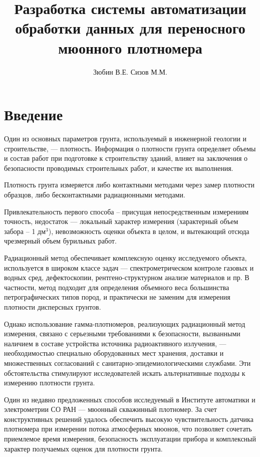 \documentclass[a4paper,10pt]{article}
\title{Разработка системы автоматизации обработки данных для переносного мюонного плотномера}
\author{Зюбин В.Е. Сизов М.М.}
\begin{document}
\maketitle



\section{Введение} 
Один из основных параметров грунта, используемый в инженерной геологии и строительстве, ---
плотность. Информация о плотности грунта 
определяет объемы и состав работ при подготовке к строительству зданий, влияет на заключения о 
безопасности проводимых строительных работ, и качестве их выполнения. 

Плотность грунта измеряется либо контактными методами через замер плотности образцов, 
либо бесконтактными радиационными методами.

Привлекательность первого способа – присущая непосредственным измерениям точность, недостаток ---
локальный характер измерения (характерный объем забора – 1 дм$^{3}$), невозможность оценки объекта в целом,
и вытекающий отсюда чрезмерный объем бурильных работ.

Радиационный метод обеспечивает комплексную оценку исследуемого объекта, используется в широком классе задач ---
спектрометрическом контроле газовых и водных сред, дефектоскопии, рентгено-структурном анализе материалов и пр. 
В частности, метод подходит для определения объемного веса большинства петрографических типов пород, и практически 
не заменим для измерения плотности дисперсных грунтов. 

Однако использование гамма-плотномеров, реализующих радиационный метод измерения, связано с серьезными требованиями 
к безопасности, вызванными наличием в составе устройства источника радиоактивного излучения, --- необходимостью 
специально оборудованных мест хранения, доставки и множественных согласований с санитарно-эпидемиологическими службами. 
Эти обстоятельства стимулируют исследователей искать альтернативные подходы к измерению плотности грунта. 

Один из недавно предложенных способов исследуемый в Институте автоматики и электрометрии СО РАН ---
мюонный скважинный плотномер. За счет конструктивных решений удалось обеспечить высокую чувствительность 
датчика плотномера при измерении потока атмосферных мюонов, что позволяет сочетать приемлемое время измерения, 
безопасность эксплуатации прибора и комплексный характер получаемых оценок для плотности грунта.
\end{document}
